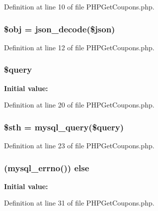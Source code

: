 Definition at line 10 of file P\-H\-P\-Get\-Coupons.\-php.

\hypertarget{_p_h_p_get_coupons_8php_a9008ed94ba185855b1723e367744b87e}{
\subsubsection[{\$obj}]{\setlength{\rightskip}{0pt plus 5cm}\$obj = json\-\_\-decode(\$json)}}\label{_p_h_p_get_coupons_8php_a9008ed94ba185855b1723e367744b87e}


Definition at line 12 of file P\-H\-P\-Get\-Coupons.\-php.

\hypertarget{_p_h_p_get_coupons_8php_af59a5f7cd609e592c41dc3643efd3c98}{
\subsubsection[{\$query}]{\setlength{\rightskip}{0pt plus 5cm}\$query}}\label{_p_h_p_get_coupons_8php_af59a5f7cd609e592c41dc3643efd3c98}
{\bfseries Initial value\-:}


Definition at line 20 of file P\-H\-P\-Get\-Coupons.\-php.

\hypertarget{_p_h_p_get_coupons_8php_afa9126f9664959c02795be300a135f93}{
\subsubsection[{\$sth}]{\setlength{\rightskip}{0pt plus 5cm}\$sth = mysql\-\_\-query(\$query)}}\label{_p_h_p_get_coupons_8php_afa9126f9664959c02795be300a135f93}


Definition at line 23 of file P\-H\-P\-Get\-Coupons.\-php.

\hypertarget{_p_h_p_get_coupons_8php_acd5fe7f2086f786c96623b819503b734}{
\subsubsection[{else}]{ (mysql\-\_\-errno()) else}}\label{_p_h_p_get_coupons_8php_acd5fe7f2086f786c96623b819503b734}
{\bfseries Initial value\-:}


Definition at line 31 of file P\-H\-P\-Get\-Coupons.\-php.

